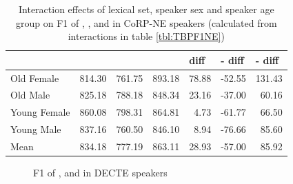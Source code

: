 \documentclass[../../../00.FullDoc/tex/ThesisSkeleton-draft2]{subfiles}
\begin{document}


\begin{table}[htbp]
	\centering
	\begin{tabular}{lrrrrrr}
		\hline
		& \multicolumn{1}{l}{\bath{}} & \multicolumn{1}{l}{\palm{}} & \multicolumn{1}{l}{\trap{}} & \multicolumn{1}{l}{\TB{} diff} & \multicolumn{1}{l}{\palm{}-\bath{} diff} & \multicolumn{1}{l}{\trap{}-\palm{} diff} \\
		\hline
		Old Female & 814.30 & 761.75 & 893.18 & 78.88 & -52.55 & 131.43 \\
		Old Male & 825.18 & 788.18 & 848.34 & 23.16 & -37.00 & 60.16 \\
		Young Female & 860.08 & 798.31 & 864.81 & 4.73  & -61.77 & 66.50 \\
		Young Male & 837.16 & 760.50 & 846.10 & 8.94  & -76.66 & 85.60 \\
		Mean  & 834.18 & 777.19 & 863.11 & 28.93 & -57.00 & 85.92 \\
		\hline
	\end{tabular}%
	\caption{Interaction effects of lexical set, speaker sex and speaker age group on F1 of \trap{}, \bath{}, and \palm{} in CoRP-NE speakers (calculated from interactions in table \ref{tbl:TBPF1NE})} \label{TBPF1NE-inter}%
\end{table}%



\begin{figure}[h]
	
	\caption{F1 of \trap{}, \bath{} and \palm{} in DECTE speakers} \label{fig:TF1NE}
\end{figure}
\end{document}
